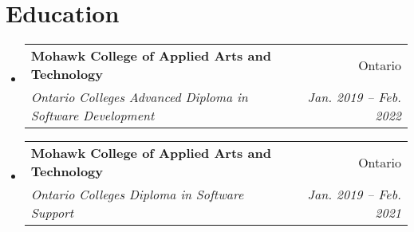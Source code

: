 \documentclass[letterpaper,11pt]{article}
\makeatletter
\newcommand{\resumeSubheading}[4]{
	\vspace{-2pt}\item
	\begin{tabular*}{0.97\textwidth}[t]{l@{\extracolsep{\fill}}r}
		\textbf{#1} & #2 \\
		\textit{\small#3} & \textit{\small #4} \\
	\end{tabular*}\vspace{-7pt}
}
\newcommand{\resumeSubHeadingListStart}{\begin{itemize}[leftmargin=0.15in, label={}]}
\newcommand{\resumeSubHeadingListEnd}{\end{itemize}}
\makeatother
\begin{document}
	

	
	
	\section{Education}
	\resumeSubHeadingListStart
	\resumeSubheading
	{Mohawk College of Applied Arts and Technology}{Ontario}
	{Ontario Colleges Advanced Diploma in Software Development}{Jan. 2019 -- Feb. 2022}
	\resumeSubheading
	{Mohawk College of Applied Arts and Technology}{Ontario}
	{Ontario Colleges Diploma in Software Support}{Jan. 2019 -- Feb. 2021}
	\resumeSubHeadingListEnd
\end{document}
